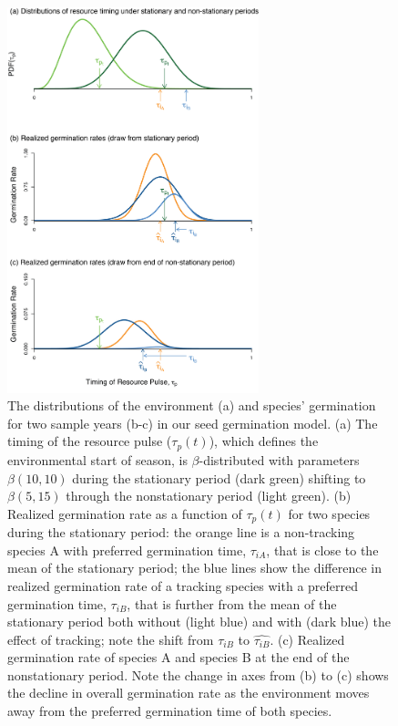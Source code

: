 \documentclass[11pt,letterpaper]{article}
\begin{document}
\begin{figure}[t!]
\centering
\includegraphics[width=0.65\textwidth]{..//..//R/graphs/conceptual/TauP_GerminationAdj.png} 
\caption{The distributions of the environment (a) and species' germination for two sample years (b-c) in our seed germination model. (a) The timing of the resource pulse ($\tau_p(t)$), which defines the environmental start of season, is $\beta$-distributed with parameters $\beta(10,10)$ during the stationary period (dark green) shifting to $\beta (5,15)$ through the nonstationary period (light green). (b) Realized germination rate as a function of $\tau_p(t)$ for two species during the stationary period: the orange line is a non-tracking species A with preferred germination time, $\tau_{iA}$, that is close to the mean of the stationary period; the blue lines show the difference in realized germination rate of a tracking species with a preferred germination time, $\tau_{iB}$, that is further from the mean of the stationary period both without (light blue) and with (dark blue) the effect of tracking; note the shift from $\tau_{iB}$ to $\hat{\tau_{iB}}$. (c) Realized germination rate of species A and species B at the end of the nonstationary period. Note the change in axes from (b) to (c) shows the decline in overall germination rate as the environment moves away from the preferred germination time of both species.} %

\label{fig:concept}
\end{figure}
\end{document}

